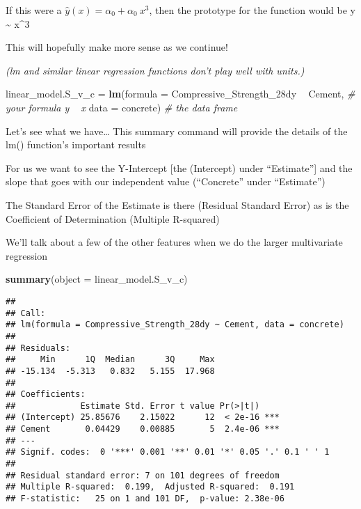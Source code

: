 \documentclass[]{article}
\newenvironment{Shaded}{\begin{snugshade}}{\end{snugshade}}
\newcommand{\CommentTok}[1]{\textcolor[rgb]{0.56,0.35,0.01}{\textit{#1}}}
\newcommand{\DataTypeTok}[1]{\textcolor[rgb]{0.13,0.29,0.53}{#1}}
\newcommand{\KeywordTok}[1]{\textcolor[rgb]{0.13,0.29,0.53}{\textbf{#1}}}
\newcommand{\NormalTok}[1]{#1}
\newcommand{\OperatorTok}[1]{\textcolor[rgb]{0.81,0.36,0.00}{\textbf{#1}}}
\newcommand{\StringTok}[1]{\textcolor[rgb]{0.31,0.60,0.02}{#1}}
\begin{document}
If this were a \(\widehat{y}(x)={\alpha_0}+{\alpha_0}\ x^3\), then the
prototype for the function would be y \textasciitilde{} x\^{}3

This will hopefully make more sense as we continue!

\emph{(lm and similar linear regression functions don't play well with
units.)}

\begin{Shaded}
\begin{Highlighting}[]
\NormalTok{linear_model.S_v_c =}\StringTok{  }\KeywordTok{lm}\NormalTok{(}\DataTypeTok{formula =}\NormalTok{ Compressive_Strength_28dy }\OperatorTok{~}\StringTok{ }\NormalTok{Cement, }\CommentTok{# your formula y ~ x}
                         \DataTypeTok{data    =}\NormalTok{ concrete)                           }\CommentTok{# the data frame}
\end{Highlighting}
\end{Shaded}

Let's see what we have\ldots{} This summary command will provide the
details of the lm() function's important results

For us we want to see the Y-Intercept {[}the (Intercept) under
``Estimate''{]} and the slope that goes with our independent value
(``Concrete'' under ``Estimate'')

The Standard Error of the Estimate is there (Residual Standard Error) as
is the Coefficient of Determination (Multiple R-squared)

We'll talk about a few of the other features when we do the larger
multivariate regression

\begin{Shaded}
\begin{Highlighting}[]
 \KeywordTok{summary}\NormalTok{(}\DataTypeTok{object =}\NormalTok{ linear_model.S_v_c)}
\end{Highlighting}
\end{Shaded}

\begin{verbatim}
## 
## Call:
## lm(formula = Compressive_Strength_28dy ~ Cement, data = concrete)
## 
## Residuals:
##     Min      1Q  Median      3Q     Max 
## -15.134  -5.313   0.832   5.155  17.968 
## 
## Coefficients:
##             Estimate Std. Error t value Pr(>|t|)    
## (Intercept) 25.85676    2.15022      12  < 2e-16 ***
## Cement       0.04429    0.00885       5  2.4e-06 ***
## ---
## Signif. codes:  0 '***' 0.001 '**' 0.01 '*' 0.05 '.' 0.1 ' ' 1
## 
## Residual standard error: 7 on 101 degrees of freedom
## Multiple R-squared:  0.199,  Adjusted R-squared:  0.191 
## F-statistic:   25 on 1 and 101 DF,  p-value: 2.38e-06
\end{verbatim}
\end{document}
